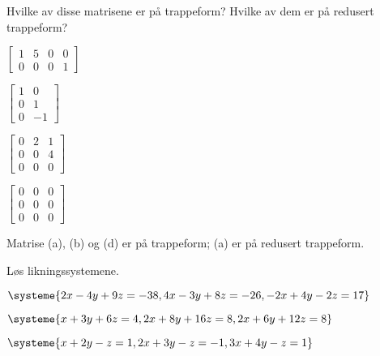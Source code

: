 
\begin{oppgave}
Hvilke av disse matrisene er på trappeform?  Hvilke av dem er på
redusert trappeform?
\begin{punkt}
$
\begin{bmatrix}
1 & 5 & 0 & 0 \\
0 & 0 & 0 & 1
\end{bmatrix}
$
\end{punkt}
\begin{punkt}
$
\begin{bmatrix}
1 & 0 \\
0 & 1 \\
0 & -1
\end{bmatrix}
$
\end{punkt}
\begin{punkt}
$
\begin{bmatrix}
0 & 2 & 1 \\
0 & 0 & 4 \\
0 & 0 & 0
\end{bmatrix}
$
\end{punkt}
\begin{punkt}
$
\begin{bmatrix}
0 & 0 & 0 \\
0 & 0 & 0 \\
0 & 0 & 0
\end{bmatrix}
$
\end{punkt}
\end{oppgave}
\begin{losning}
Matrise (a), (b) og (d) er på trappeform; (a) er på redusert trappeform.
\end{losning}

\begin{oppgave}
Løs likningssystemene.
\begin{punkt}
$
\systeme{
  2x - 4y + 9z = -38,
  4x - 3y + 8z = -26,
 -2x + 4y - 2z =  17
}
$
\end{punkt}
\begin{punkt}
$
\systeme{
  x + 3y +  6z = 4,
 2x + 8y + 16z = 8,
 2x + 6y + 12z = 8
}
$
\end{punkt}
\begin{punkt}
$
\systeme{
	x  + 2y - z = 1,
	2x + 3y - z = -1,
	3x + 4y - z = 1
}
$
\end{punkt}
\end{oppgave}

